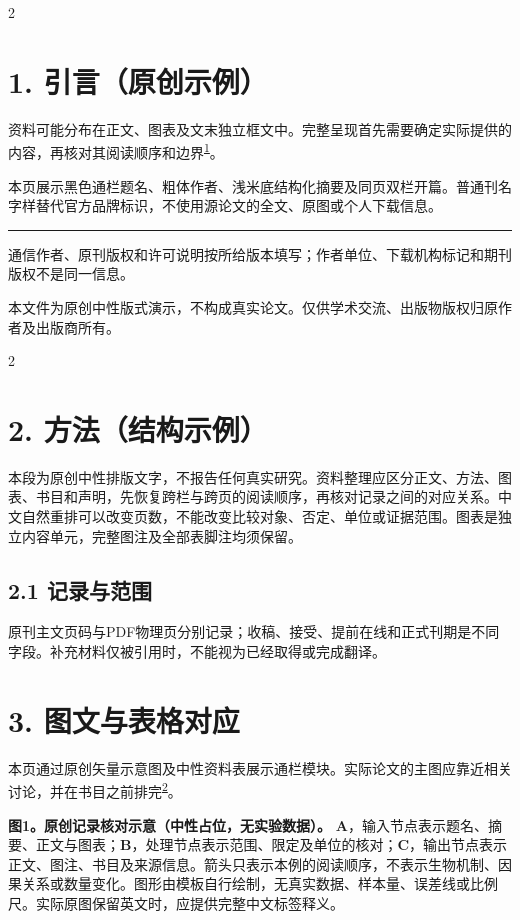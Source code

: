 \documentclass[UTF8,fontset=none,scheme=plain]{ctexart}
\newcommand{\CVRCite}[1]{\textsuperscript{\hyperlink{cvr-ref:#1}{#1}}}
\newcommand{\CVRBody}{本段为原创中性排版文字，不报告任何真实研究。资料整理应区分正文、方法、图表、书目和声明，先恢复跨栏与跨页的阅读顺序，再核对记录之间的对应关系。中文自然重排可以改变页数，不能改变比较对象、否定、单位或证据范围。图表是独立内容单元，完整图注及全部表脚注均须保留。}
\begin{document}
\begin{multicols}{2}
\section*{1. 引言（原创示例）}
资料可能分布在正文、图表及文末独立框文中。完整呈现首先需要确定实际提供的内容，再核对其阅读顺序和边界\CVRCite{1}。

本页展示黑色通栏题名、粗体作者、浅米底结构化摘要及同页双栏开篇。普通刊名字样替代官方品牌标识，不使用源论文的全文、原图或个人下载信息。
\end{multicols}
\vfill\noindent\rule{\textwidth}{.4bp}\par
{\fontsize{7bp}{9bp}\selectfont *通信作者、原刊版权和许可说明按所给版本填写；作者单位、下载机构标记和期刊版权不是同一信息。\par
本文件为原创中性版式演示，不构成真实论文。仅供学术交流、出版物版权归原作者及出版商所有。\par}
\clearpage
{}
\begin{multicols}{2}
\section*{2. 方法（结构示例）}
\CVRBody
\subsection*{2.1 记录与范围}
原刊主文页码与PDF物理页分别记录；收稿、接受、提前在线和正式刊期是不同字段。补充材料仅被引用时，不能视为已经取得或完成翻译。
\section*{3. 图文与表格对应}
本页通过原创矢量示意图及中性资料表展示通栏模块。实际论文的主图应靠近相关讨论，并在书目之前排完\CVRCite{2}。
\end{multicols}\vspace{5bp}
\noindent\begin{minipage}{\textwidth}
\begin{center}\begin{minipage}{.72\textwidth}\DemoVector\end{minipage}\end{center}
{\fontsize{7.6bp}{9.2bp}\selectfont\textbf{图1。原创记录核对示意（中性占位，无实验数据）。}
\textbf{A}，输入节点表示题名、摘要、正文与图表；\textbf{B}，处理节点表示范围、限定及单位的核对；\textbf{C}，输出节点表示正文、图注、书目及来源信息。箭头只表示本例的阅读顺序，不表示生物机制、因果关系或数量变化。图形由模板自行绘制，无真实数据、样本量、误差线或比例尺。实际原图保留英文时，应提供完整中文标签释义。\par}
\end{minipage}\vspace{12bp}
\end{document}
